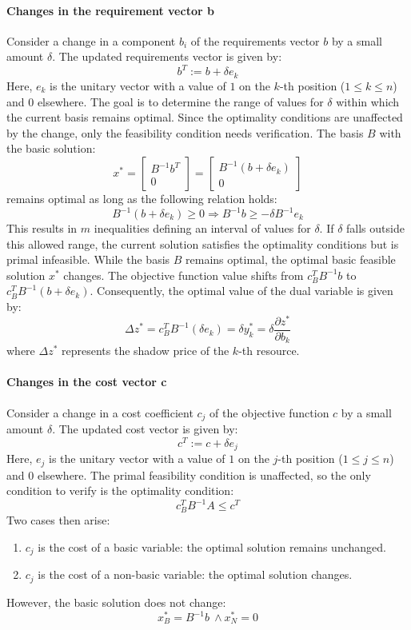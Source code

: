 \paragraph*{Changes in the requirement vector b}
Consider a change in a component $b_i$ of the requirements vector $b$ by a small amount $\delta$.
The updated requirements vector is given by:
\[ b^T := b + \delta e_k \]
Here, $e_k$ is the unitary vector with a value of $1$ on the $k$-th position ($1 \leq k \leq n$) and $0$ elsewhere.
The goal is to determine the range of values for $\delta$ within which the current basis remains optimal. 
Since the optimality conditions are unaffected by the change, only the feasibility condition needs verification.
The basis $B$ with the basic solution: 
\[ x^{\ast} = \begin{bmatrix} B^{-1} b^T \\ 0 \end{bmatrix} = \begin{bmatrix} B^{-1} \left( b + \delta e_k \right) \\ 0 \end{bmatrix} \]
remains optimal as long as the following relation holds:
\[ B^{-1} \left( b + \delta e_k \right) \geq 0 \Rightarrow B^{-1} b \geq - \delta B^{-1} e_k \]
This results in $m$ inequalities defining an interval of values for $\delta$.
If $\delta$ falls outside this allowed range, the current solution satisfies the optimality conditions but is primal infeasible.
While the basis $B$ remains optimal, the optimal basic feasible solution $x^{\ast}$ changes.
The objective function value shifts from $c_B^T B^{-1} b$ to $c_B^T B^{-1} \left( b + \delta e_k \right)$. 
Consequently, the optimal value of the dual variable is given by:
\[ \Delta z^{\ast} = c_B^T B^{-1} \left( \delta e_k \right) = \delta  y_k^{\ast} = \delta  \dfrac{\partial z^{\ast}}{\partial b_k}\]
where $\Delta z^{\ast}$ represents the shadow price of the $k$-th resource.

\paragraph*{Changes in the cost vector c}
Consider a change in a cost coefficient $c_j$ of the objective function $c$ by a small amount $\delta$.
The updated cost vector is given by:
\[ c^T := c + \delta  e_j \]
Here, $e_j$ is the unitary vector with a value of $1$ on the $j$-th position ($1 \leq j \leq n$) and $0$ elsewhere.
The primal feasibility condition is unaffected, so the only condition to verify is the optimality condition:
\[ c^T_B B^{-1} A \leq c^T \]
Two cases then arise:
\begin{enumerate}
  \item $c_j$ is the cost of a basic variable: the optimal solution remains unchanged.
  \item $c_j$ is the cost of a non-basic variable: the optimal solution changes.
\end{enumerate}
However, the basic solution does not change:
\[ x_B^{\ast} = B^{-1} b \ \land x_N^{\ast} = 0 \]

